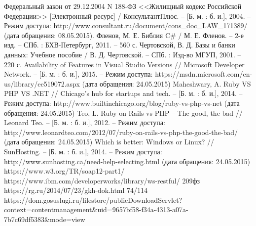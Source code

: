 \begin{thebibliography}{99}
	 Федеральный закон от 29.12.2004 N 188-ФЗ <<Жилищный кодекс Российской Федерации>> [Электронный ресурс] / КонсультантПлюс. – [Б. м. : б. и.], 2004. – Режим доступа: http://www.consultant.ru/document/cons\_doc\_LAW\_171389/ (дата обращения: 08.05.2015).
	 Фленов, М. Е. Библия C\# / М. Е. Фленов. – 2-е изд. – СПб. : БХВ-Петербург, 2011. – 560 с.
	 Чертовской, В. Д. Базы и банки данных: Учебное пособие / В. Д. Чертовской. – СПб. : Изд-во МГУП, 2001. –  220 с.
	 Availability of Features in Visual Studio Versions // Microsoft Developer Network. – [Б. м. : б. и.], 2015. – Режим доступа: https://msdn.microsoft.com/en-us/library/ee519072.aspx (дата обращения: 24.05.2015)
	 Maheshwary, A. Ruby VS PHP VS .NET // Chicago's hub for startups and tech. – [Б. м. : б. и.], 2014. – Режим доступа: http://www.builtinchicago.org/blog/ruby-vs-php-vs-net (дата обращения: 24.05.2015)
	 Teo, L. Ruby on Rails vs PHP – The good, the bad // Leonard Teo. – [Б. м. : б. и.], 2012. – Режим доступа: http://www.leonardteo.com/2012/07/ruby-on-rails-vs-php-the-good-the-bad/ (дата обращения: 24.05.2015)
	 Which is better: Windows or Linux? // SunHosting. – [Б. м. : б. и.], 2014. – Режим доступа: http://www.sunhosting.ca/need-help-selecting.html (дата обращения: 24.05.2015)
	 https://www.w3.org/TR/soap12-part1/
	 https://www.ibm.com/developerworks/library/ws-restful/
	 209фз https://rg.ru/2014/07/23/gkh-dok.html
	 74/114 https://dom.gosuslugi.ru/filestore/publicDownloadServlet?context=contentmanagement\&uid=9657bf58-f34a-4313-a07a-7b7c69df5383\&mode=view
\end{thebibliography}


\clearpage
\newpage